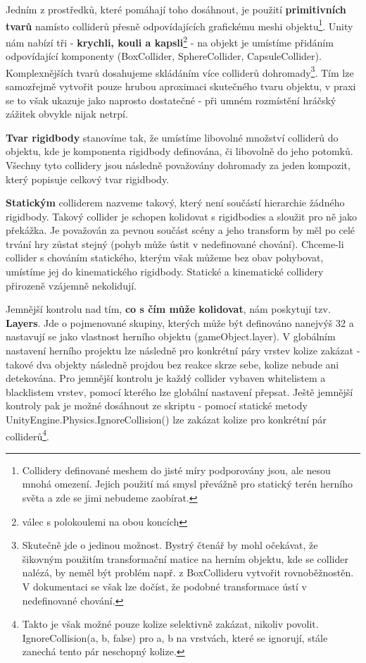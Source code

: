 Jedním z prostředků, které pomáhají toho dosáhnout, je použití \textbf{primitivních tvarů} namísto colliderů přesně odpovídajících grafickému meshi objektu\footnote{Collidery definované meshem do jisté míry podporovány jsou, ale nesou mnohá omezení. Jejich použití má smysl převážně pro statický terén herního světa a zde se jimi nebudeme zaobírat.}. Unity nám nabízí tři - \textbf{krychli, kouli a kapsli}\footnote{válec s polokoulemi na obou koncích} - na objekt je umístíme přidáním odpovídající komponenty (BoxCollider, SphereCollider, CapsuleCollider). Komplexnějších tvarů dosahujeme skládáním více colliderů dohromady\footnote{Skutečně jde o jedinou možnost. Bystrý čtenář by mohl očekávat, že šikovným použitím transformační matice na herním objektu, kde se collider nalézá, by neměl být problém např. z BoxCollideru vytvořit rovnoběžnostěn. V dokumentaci se však lze dočíst, že podobné transformace ústí v nedefinované chování.}. Tím lze samozřejmě vytvořit pouze hrubou aproximaci skutečného tvaru objektu, v praxi se to však ukazuje jako naprosto dostatečné - při umném rozmístění hráčský zážitek obvykle nijak netrpí.

\textbf{Tvar rigidbody} stanovíme tak, že umístíme libovolné množství colliderů do objektu, kde je komponenta rigidbody definována, či libovolně do jeho potomků. Všechny tyto collidery jsou následně považovány dohromady za jeden kompozit, který popisuje celkový tvar rigidbody. 

\textbf{Statickým} colliderem nazveme takový, který není součástí hierarchie žádného rigidbody. Takový collider je schopen kolidovat s rigidbodies a sloužit pro ně jako překážka. Je považován za pevnou součást scény a jeho transform by měl po celé trvání hry zůstat stejný (pohyb může ústit v nedefinované chování). Chceme-li collider s chováním statického, kterým však můžeme bez obav pohybovat, umístíme jej do kinematického rigidbody. Statické a kinematické collidery přirozeně vzájemně nekolidují.

Jemnější kontrolu nad tím, \textbf{co s čím může kolidovat}, nám poskytují tzv. \textbf{Layers}. Jde o pojmenované skupiny, kterých může být definováno nanejvýš 32 a nastavují se jako vlastnost herního objektu (gameObject.layer). V globálním nastavení herního projektu lze následně pro konkrétní páry vrstev kolize zakázat - takové dva objekty následně projdou bez reakce skrze sebe, kolize nebude ani detekována. Pro jemnější kontrolu je každý collider vybaven whitelistem a blacklistem vrstev, pomocí kterého lze globální nastavení přepsat. Ještě jemnější kontroly pak je možné dosáhnout ze skriptu - pomocí statické metody UnityEngine.Physics.IgnoreCollision() lze zakázat kolize pro konkrétní pár colliderů\footnote{Takto je však možné pouze kolize selektivně zakázat, nikoliv povolit. IgnoreCollision(a, b, false) pro a, b na vrstvách, které se ignorují, stále zanechá tento pár neschopný kolize.}.

